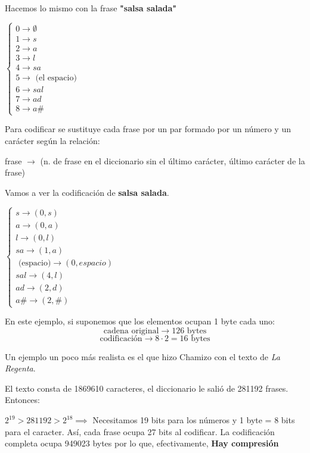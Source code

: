 	\begin{example}
		Hacemos lo mismo con la frase \textbf{"salsa salada"}


		$\begin{cases}
		0 \rightarrow \emptyset\\
		1\rightarrow s\\
		2 \rightarrow a\\
		3\rightarrow l\\
		4 \rightarrow sa\\
		5 \rightarrow \text{ (el espacio)}\\
		6\rightarrow sal\\
		7 \rightarrow ad\\
		8 \rightarrow a\#
		\end{cases}$

	\end{example}


Para codificar se sustituye cada frase por un par formado por un número y un carácter según la relación:

frase $\rightarrow$ (n. de frase en el diccionario sin el último carácter, último carácter de la frase)

\begin{example}
	Vamos a ver la codificación de \textbf{salsa salada}.

	$\begin{cases}
	s \rightarrow (0,s)\\
	a \rightarrow (0,a)\\
	l \rightarrow (0,l)\\
	sa \rightarrow (1,a)\\
	\text{ (espacio)} \rightarrow (0,espacio)\\
	sal \rightarrow (4,l)\\
	ad \rightarrow (2,d)\\
	a\# \rightarrow (2, \#)
	\end{cases}$

	En este ejemplo, si suponemos que los elementos ocupan 1 byte cada uno:
	$$\text{cadena original} \rightarrow 126 \text{ bytes}$$
	$$\text{codificación} \rightarrow 8\cdot 2 =16 \text{ bytes}$$
\end{example}

Un ejemplo un poco más realista es el que hizo Chamizo con el texto de \textit{La Regenta}.

El texto consta de 1869610 caracteres, el diccionario le salió de 281192 frases. Entonces:

$2^{19} > 281192 > 2^{18}\implies$ Necesitamos 19 bits para los números y 1 byte = 8 bits para el caracter. Así, cada frase ocupa 27 bits al codificar. La codificación completa ocupa 949023 bytes por lo que, efectivamente, \textbf{Hay compresión}

